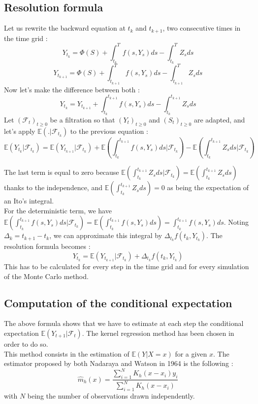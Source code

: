 \documentclass[a4paper,11pt,english]{book}
\begin{document}
\subsection{Resolution formula}
Let us rewrite the backward equation at $t_{k}$ and $t_{k+1}$, two consecutive times in the time grid :
$$Y_{t_{k}} = \Phi(S) + \int_{t_{k}}^{T} f(s,Y_{s}) ds - \int_{t_{k}}^{T} Z_{s} ds$$
$$Y_{t_{k+1}} = \Phi(S) + \int_{t_{k+1}}^{T} f(s,Y_{s}) ds - \int_{t_{k+1}}^{T} Z_{s} ds$$
Now let's make the difference between both :
$$Y_{t_{k}} = Y_{t_{k+1}} + \int_{t_{k}}^{t_{k+1}} f(s,Y_{s}) ds - \int_{t_{k}}^{t_{k+1}}Z_{s} ds$$
Let $(\mathcal{F}_{t})_{t\geq0}$ be a filtration so that $(Y_{t})_{t\geq0}$ and $(S_{t})_{t\geq0}$ are adapted, and let's apply $\mathbb{E}(.|\mathcal{F}_{t_{k}})$ to the previous equation :
$$\mathbb{E}(Y_{t_{k}}|\mathcal{F}_{t_{k}}) = \mathbb{E}(Y_{t_{k+1}}|\mathcal{F}_{t_{k}}) + \mathbb{E}(\int_{t_{k}}^{t_{k+1}} f(s,Y_{s}) ds|\mathcal{F}_{t_{k}}) - \mathbb{E}(\int_{t_{k}}^{t_{k+1}}Z_{s} ds|\mathcal{F}_{t_{k}})$$

The last term is equal to zero because $\mathbb{E}(\int_{t_{k}}^{t_{k+1}}Z_{s} ds|\mathcal{F}_{t_{k}})=\mathbb{E}(\int_{t_{k}}^{t_{k+1}}Z_{s} ds)$ thanks to the independence, and $\mathbb{E}(\int_{t_{k}}^{t_{k+1}}Z_{s} ds)=0$ as being the expectation of an Ito's integral.\\
For the deterministic term, we have $\mathbb{E}(\int_{t_{k}}^{t_{k+1}}f(s,Y_{s}) ds|\mathcal{F}_{t_{k}})=\mathbb{E}(\int_{t_{k}}^{t_{k+1}}f(s,Y_{s}) ds) = \int_{t_{k}}^{t_{k+1}}f(s,Y_{s}) ds$. Noting $\Delta_{k}=t_{k+1}-t_{k}$, we can approximate this integral by $\Delta_{t_{k}}f(t_{k},Y_{t_{k}})$.
The resolution formula becomes :
\begin{equation}
Y_{t_{k}} = \mathbb{E}(Y_{t_{k+1}}|\mathcal{F}_{t_{k}}) + \Delta_{t_{k}}f(t_{k},Y_{t_{k}})
\label{resolutionFormula}
\end{equation}
This has to be calculated for every step in the time grid and for every simulation of the Monte Carlo method.
\subsection{Computation of the conditional expectation}
\label{subsec:conditional-expectation}
The above formula shows that we have to estimate at each step the conditional expectation $\mathbb{E}(Y_{t+1}|\mathcal{F}_{t})$. The kernel regression method has been chosen in order to do so.\\

This method consists in the estimation of $\mathbb{E}(Y|X=x)$ for a given $x$. The estimator proposed by both Nadaraya\cite{nadaraya1964estimating} and Watson\cite{watson1964smooth} in 1964 is the following : $$\hat{m}_{h}(x)=\frac{\sum_{i=1}^{N}K_{h}(x-x_{i})y_{i}}{\sum_{i=1}^{N}K_{h}(x-x_{i})}$$
with $N$ being the number of observations drawn independently.\\
\end{document}

